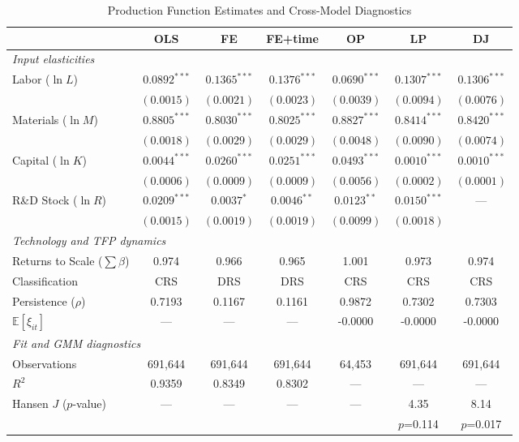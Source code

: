 \documentclass[a4paper, 12pt]{article}
\begin{document}
\begin{table}[htbp]
\centering
\caption{Production Function Estimates and Cross-Model Diagnostics}
\label{tab:main_results}
\begin{tabular}{lcccccc}
\toprule
 & OLS & FE & FE+time & OP & LP & DJ \\
\midrule
\multicolumn{7}{l}{\textit{Input elasticities}} \\
  Labor ($\ln L$) & $0.0892^{***}$ & $0.1365^{***}$ & $0.1376^{***}$ & $0.0690^{***}$ & $0.1307^{***}$ & $0.1306^{***}$ \\
   & $(0.0015)$ & $(0.0021)$ & $(0.0023)$ & $(0.0039)$ & $(0.0094)$ & $(0.0076)$ \\
  Materials ($\ln M$) & $0.8805^{***}$ & $0.8030^{***}$ & $0.8025^{***}$ & $0.8827^{***}$ & $0.8414^{***}$ & $0.8420^{***}$ \\
   & $(0.0018)$ & $(0.0029)$ & $(0.0029)$ & $(0.0048)$ & $(0.0090)$ & $(0.0074)$ \\
  Capital ($\ln K$) & $0.0044^{***}$ & $0.0260^{***}$ & $0.0251^{***}$ & $0.0493^{***}$ & $0.0010^{***}$ & $0.0010^{***}$ \\
   & $(0.0006)$ & $(0.0009)$ & $(0.0009)$ & $(0.0056)$ & $(0.0002)$ & $(0.0001)$ \\
  R\&D Stock ($\ln R$) & $0.0209^{***}$ & $0.0037^{*}$ & $0.0046^{**}$ & $0.0123^{**}$ & $0.0150^{***}$ & --- \\
   & $(0.0015)$ & $(0.0019)$ & $(0.0019)$ & $(0.0099)$ & $(0.0018)$ &  \\
\midrule
\multicolumn{7}{l}{\textit{Technology and TFP dynamics}} \\
  Returns to Scale ($\sum \beta$) & 0.974 & 0.966 & 0.965 & 1.001 & 0.973 & 0.974 \\
  \quad Classification & CRS & DRS & DRS & CRS & CRS & CRS \\
  Persistence ($\rho$) & 0.7193 & 0.1167 & 0.1161 & 0.9872 & 0.7302 & 0.7303 \\
  $\mathbb{E}[\xi_{it}]$ & --- & --- & --- & -0.0000 & -0.0000 & -0.0000 \\
\midrule
\multicolumn{7}{l}{\textit{Fit and GMM diagnostics}} \\
  Observations & 691,644 & 691,644 & 691,644 & 64,453 & 691,644 & 691,644 \\
  $R^2$ & 0.9359 & 0.8349 & 0.8302 & --- & --- & --- \\
  Hansen $J$ ($p$-value) & --- & --- & --- & --- & 4.35 & 8.14 \\
    &  &  &  &  & $p$=0.114 & $p$=0.017 \\

\end{tabular}
\end{table}
\end{document}
